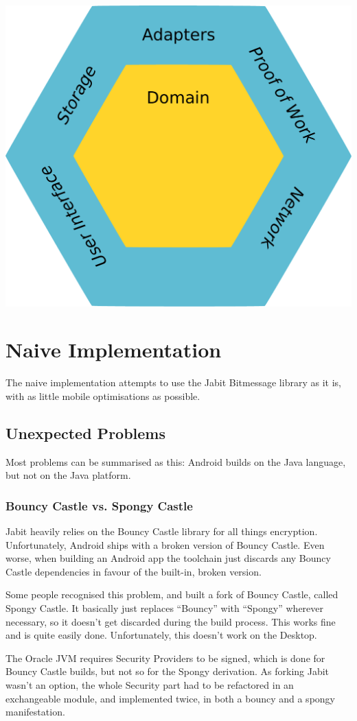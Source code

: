 \documentclass{bfh}
\begin{document}
  \begin{center}
    \includegraphics[width=0.5 \textwidth]{images/ports_and_adapters.pdf}
  \end{center}

  \section{Naive Implementation}
  
  The naive implementation attempts to use the Jabit Bitmessage library as it is, with as little mobile optimisations as possible.

  \subsection{Unexpected Problems}
  Most problems can be summarised as this: Android builds on the Java language, but not on the Java platform.
  
  \subsubsection{Bouncy Castle vs. Spongy Castle}
  Jabit heavily relies on the Bouncy Castle library for all things encryption. Unfortunately, Android ships with a broken version of Bouncy Castle. Even worse, when building an Android app the toolchain just discards any Bouncy Castle dependencies in favour of the built-in, broken version.

  Some people recognised this problem, and built a fork of Bouncy Castle, called Spongy Castle. It basically just replaces “Bouncy” with “Spongy” wherever necessary, so it doesn’t get discarded during the build process. This works fine and is quite easily done. Unfortunately, this doesn’t work on the Desktop.

  The Oracle JVM requires Security Providers to be signed, which is done for Bouncy Castle builds, but not so for the Spongy derivation. As forking Jabit wasn’t an option, the whole Security part had to be refactored in an exchangeable module, and implemented twice, in both a bouncy and a spongy manifestation.
\end{document}
